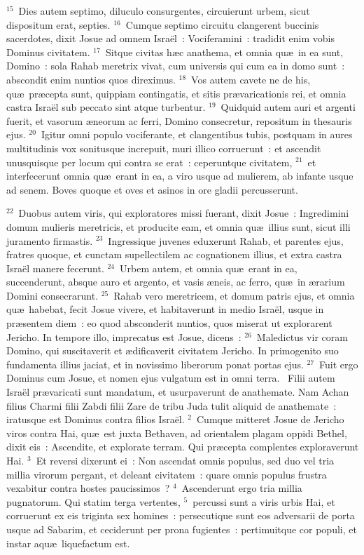 ${}^{15}$~Dies autem septimo, diluculo consurgentes, circuierunt urbem, sicut dispositum erat, septies.
${}^{16}$~Cumque septimo circuitu clangerent buccinis sacerdotes, dixit Josue ad omnem Isra\"el~: Vociferamini~: tradidit enim vobis Dominus civitatem.
${}^{17}$~Sitque civitas h\ae c anathema, et omnia qu\ae\ in ea sunt, Domino~: sola Rahab meretrix vivat, cum universis qui cum ea in domo sunt~: abscondit enim nuntios quos direximus.
${}^{18}$~Vos autem cavete ne de his, qu\ae\ pr\ae cepta sunt, quippiam contingatis, et sitis pr\ae varicationis rei, et omnia castra Isra\"el sub peccato sint atque turbentur.
${}^{19}$~Quidquid autem auri et argenti fuerit, et vasorum \ae neorum ac ferri, Domino consecretur, repositum in thesauris ejus.
${}^{20}$~Igitur omni populo vociferante, et clangentibus tubis, postquam in aures multitudinis vox sonitusque increpuit, muri illico corruerunt~: et ascendit unusquisque per locum qui contra se erat~: ceperuntque civitatem,
${}^{21}$~et interfecerunt omnia qu\ae\ erant in ea, a viro usque ad mulierem, ab infante usque ad senem. Boves quoque et oves et asinos in ore gladii percusserunt.


${}^{22}$~Duobus autem viris, qui exploratores missi fuerant, dixit Josue~: Ingredimini domum mulieris meretricis, et producite eam, et omnia qu\ae\ illius sunt, sicut illi juramento firmastis.
${}^{23}$~Ingressique juvenes eduxerunt Rahab, et parentes ejus, fratres quoque, et cunctam supellectilem ac cognationem illius, et extra castra Isra\"el manere fecerunt.
${}^{24}$~Urbem autem, et omnia qu\ae\ erant in ea, succenderunt, absque auro et argento, et vasis \ae neis, ac ferro, qu\ae\ in \ae rarium Domini consecrarunt.
${}^{25}$~Rahab vero meretricem, et domum patris ejus, et omnia qu\ae\ habebat, fecit Josue vivere, et habitaverunt in medio Isra\"el, usque in pr\ae sentem diem~: eo quod absconderit nuntios, quos miserat ut explorarent Jericho. In tempore illo, imprecatus est Josue, dicens~:
${}^{26}$~Maledictus vir coram Domino, qui suscitaverit et \ae dificaverit civitatem Jericho. In primogenito suo fundamenta illius jaciat, et in novissimo liberorum ponat portas ejus.
${}^{27}$~Fuit ergo Dominus cum Josue, et nomen ejus vulgatum est in omni terra.
~\lettrine[lines=10,image=true,loversize=0.05,lraise=-0.03]{F}{}ilii autem Isra\"el pr\ae varicati sunt mandatum, et usurpaverunt de anathemate. Nam Achan filius Charmi filii Zabdi filii Zare de tribu Juda tulit aliquid de anathemate~: iratusque est Dominus contra filios Isra\"el.
${}^{2}$~Cumque mitteret Josue de Jericho viros contra Hai, qu\ae\ est juxta Bethaven, ad orientalem plagam oppidi Bethel, dixit eis~: Ascendite, et explorate terram. Qui pr\ae cepta complentes exploraverunt Hai.
${}^{3}$~Et reversi dixerunt ei~: Non ascendat omnis populus, sed duo vel tria millia virorum pergant, et deleant civitatem~: quare omnis populus frustra vexabitur contra hostes paucissimos~?
${}^{4}$~Ascenderunt ergo tria millia pugnatorum. Qui statim terga vertentes,
${}^{5}$~percussi sunt a viris urbis Hai, et corruerunt ex eis triginta sex homines~: persecutique sunt eos adversarii de porta usque ad Sabarim, et ceciderunt per prona fugientes~: pertimuitque cor populi, et instar aqu\ae\ liquefactum est.


